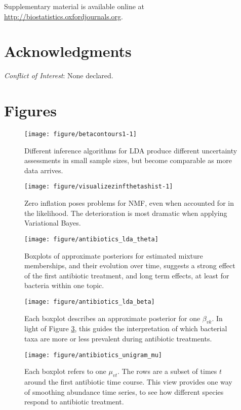 \documentclass[oupdraft]{bio}
\begin{document}
Supplementary material is available online at
\url{http://biostatistics.oxfordjournals.org}.

\section*{Acknowledgments}

{\it Conflict of Interest}: None declared.




\section{Figures}

\begin{figure}[!p]
  \centering\texttt{[image: figure/betacontours1-1]}
  \caption{Different inference algorithms for LDA produce different uncertainty
    assessments in small sample sizes, but become comparable as more data arrives.}
  \label{fig:lda_contours}
\end{figure}

\begin{figure}[!p]
  \centering\texttt{[image: figure/visualizezinfthetashist-1]}
  \caption{Zero inflation poses problems for NMF, even when accounted for in the
    likelihood. The deterioration is most dramatic when applying Variational Bayes.}
  \label{fig:zinf_thetas}
\end{figure}

\begin{figure}[!p]
  \centering\texttt{[image: figure/antibiotics\_lda\_theta]}
  \caption{Boxplots of approximate posteriors for estimated mixture memberships,
    and their evolution over time, suggests a strong effect of the first
    antibiotic treatment, and long term effects, at least for bacteria within
    one topic.}
  \label{fig:antibiotics_lda_theta}
\end{figure}

\begin{figure}[!p]
  \centering\texttt{[image: figure/antibiotics\_lda\_beta]}
  \caption{Each boxplot describes an approximate posterior for one $\beta_{vk}$.
    In light of Figure \ref{fig:antibiotics_lda_theta}, this guides the
    interpretation of which bacterial taxa are more or less prevalent during
    antibiotic treatments.}
  \label{fig:antibiotics_lda_beta}
\end{figure}

\begin{figure}[!p]
  \centering
  \texttt{[image: figure/antibiotics\_unigram\_mu]}
  \caption{Each boxplot refers to one $\mu_{vt}$. The rows are a subset of times
    $t$ around the first antibiotic time course. This view provides one way of
    smoothing abundance time series, to see how different species respond to
    antibiotic treatment. \label{fig:antibiotics_unigram_theta} }
\end{figure}
\end{document}
